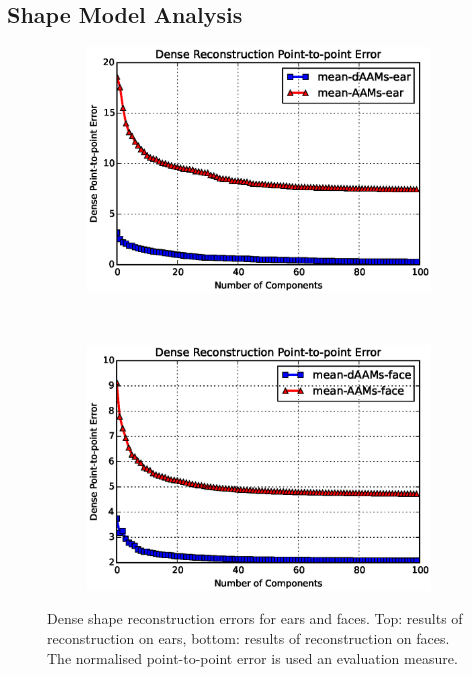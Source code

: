 \subsection{Shape Model Analysis}
\label{sec:modelanalysis}



\begin{figure}[!b]
    \centering
    \begin{subfigure}[b]{0.43\textwidth}
            \includegraphics[width=\textwidth]{Suplementory_Meterial/Model_Analysis/sr_ear}
    \end{subfigure}
    \\
    \begin{subfigure}[b]{0.43\textwidth}
            \includegraphics[width=\textwidth]{Suplementory_Meterial/Model_Analysis/sr_face}
    \end{subfigure}
    \caption{Dense shape reconstruction errors for ears and faces. Top: results of reconstruction on ears, bottom: results of reconstruction on faces. The normalised point-to-point error is used an evaluation measure.}
    \label{fig:rc_face}
\end{figure}


